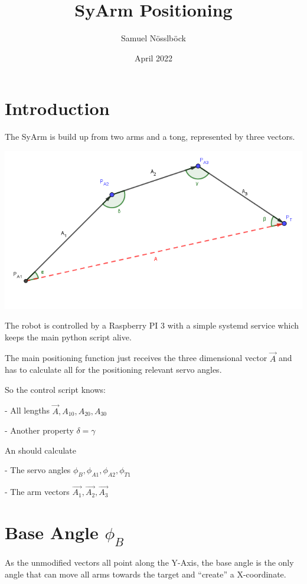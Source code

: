 \documentclass{article}
\title{SyArm Positioning}
\author{Samuel Nösslböck}
\date{April 2022}
\begin{document}
\maketitle

\section{Introduction}
    The SyArm is build up from two arms and a tong, represented by three vectors. 
    
    \includegraphics[scale=0.4]{images/Schematic.PNG}
    
    The robot is controlled by a Raspberry PI 3 with a simple systemd service which keeps the main python script alive. 
    
    The main positioning function just receives the three dimensional vector $\vec{A}$ and has to calculate all for the positioning relevant servo angles. 
    
    So the control script knows:
    
    - All lengths $\vec{A}, A_{10}, A_{20}, A_{30}$
    
    - Another property $\delta = \gamma$
    
    An should calculate
    
    - The servo angles $\phi_B, \phi_{A1}, \phi_{A2}, \phi_{T1}$
    
    - The arm vectors $\vec{A_1}, \vec{A_2}, \vec{A_3}$
    
\section{Base Angle $\phi_B$}
    As the unmodified vectors all point along the Y-Axis, the base angle is the only angle that can move all arms towards the target and “create” a X-coordinate.
    
\end{document}
